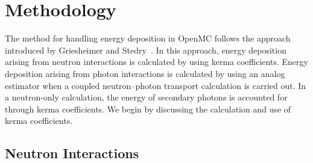 \documentclass{anstrans}
\begin{document}
\section{Methodology}

The method for handling energy deposition in OpenMC follows the approach
introduced by Griesheimer and Stedry~\cite{griesheimer2013mc}. In this approach,
energy deposition arising from neutron interactions is calculated by using kerma
coefficients. Energy deposition arising from photon interactions is calculated
by using an analog estimator when a coupled neutron--photon transport calculation
is carried out. In a neutron-only calculation, the energy of secondary photons
is accounted for through kerma coefficients. We begin by discussing the
calculation and use of kerma coefficients.

\subsection{Neutron Interactions}
\end{document}
